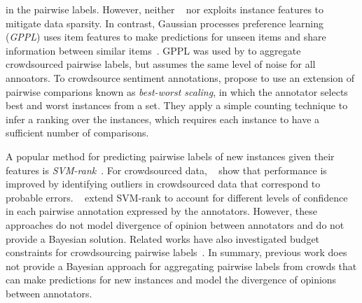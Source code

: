 in the pairwise labels. 
However, neither ~\citet{chen2013pairwise} nor \citet{wang2016blind}
exploits instance features to mitigate data sparsity.
In contrast, Gaussian processes preference learning (\emph{GPPL})
uses item features to make predictions for unseen items and
share information between similar items~\citep{chu2005preference}.
GPPL was used by \citet{simpson2018finding} to aggregate crowdsourced pairwise labels,
but assumes the same level of noise for all annoators.
To crowdsource sentiment annotations, 
\citet{kiritchenko2016capturing} propose to use an extension of pairwise comparions
known as \emph{best-worst scaling}, in which the annotator selects best and worst instances from a set.
They apply a simple counting technique to infer a ranking over the instances, which requires 
each instance to have a sufficient number of comparisons.


A popular method for predicting pairwise labels of new instances given their features is 
\emph{SVM-rank}~\cite{joachims2002optimizing}.
For crowdsourced data, ~\citet{fu2016robust} show that performance is improved by identifying outliers in crowdsourced data
that correspond to probable errors.
~\citet{uchida2017entity} extend SVM-rank to account for different levels of confidence in each pairwise annotation expressed
by the annotators.
However, these approaches do not model divergence of opinion between annotators
and do not provide a Bayesian solution.
Related works have also investigated budget constraints for crowdsourcing pairwise labels~\citep{cai2017pairwise}.
In summary, previous work does not 
provide a Bayesian approach for aggregating pairwise labels from crowds
that can make predictions for new instances
and model the divergence of opinions between annotators.

